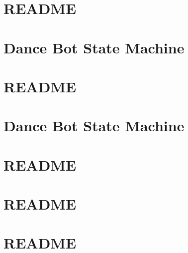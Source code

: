 \documentclass[twoside]{book}
\newcommand{\+}{\discretionary{\mbox{\scriptsize$\hookleftarrow$}}{}{}}
\begin{document}
\chapter{R\+E\+A\+D\+ME}
\label{md_smacc_sm_reference_library_sm_calendar_week_README}
\hypertarget{md_smacc_sm_reference_library_sm_calendar_week_README}{}

\chapter{Dance Bot State Machine}
\label{md_smacc_sm_reference_library_sm_dance_bot_launch_readme}
\hypertarget{md_smacc_sm_reference_library_sm_dance_bot_launch_readme}{}

\chapter{R\+E\+A\+D\+ME}
\label{md_smacc_sm_reference_library_sm_dance_bot_README}
\hypertarget{md_smacc_sm_reference_library_sm_dance_bot_README}{}

\chapter{Dance Bot State Machine}
\label{md_smacc_sm_reference_library_sm_dance_bot_strikes_back_launch_readme}
\hypertarget{md_smacc_sm_reference_library_sm_dance_bot_strikes_back_launch_readme}{}

\chapter{R\+E\+A\+D\+ME}
\label{md_smacc_sm_reference_library_sm_dance_bot_strikes_back_README}
\hypertarget{md_smacc_sm_reference_library_sm_dance_bot_strikes_back_README}{}

\chapter{R\+E\+A\+D\+ME}
\label{md_smacc_sm_reference_library_sm_packML_README}
\hypertarget{md_smacc_sm_reference_library_sm_packML_README}{}

\chapter{R\+E\+A\+D\+ME}
\label{md_smacc_sm_reference_library_sm_pr2_plugs_README}
\hypertarget{md_smacc_sm_reference_library_sm_pr2_plugs_README}{}

\end{document}

